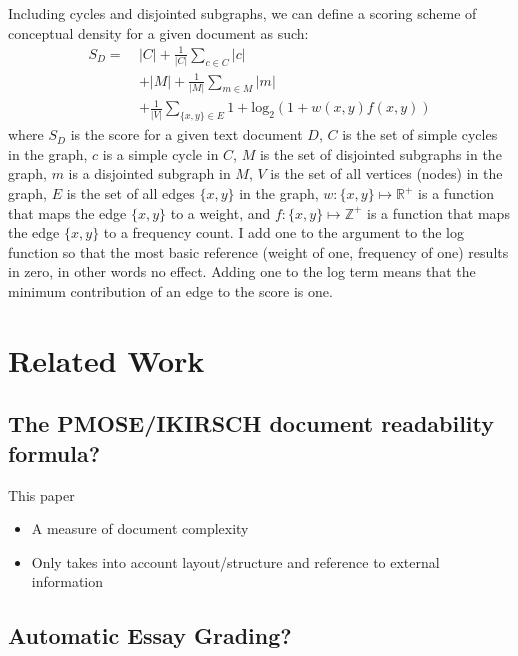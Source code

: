 \documentclass[12pt]{article}
\begin{document}
Including cycles and disjointed subgraphs, we can define a scoring scheme of conceptual density for a given document as such:
\begin{equation*}
	\begin{aligned}	
    S_D =\ &|C| + \frac{1}{|C|} \sum_{c \in C} |c| \\ 
    			&+ |M| + \frac{1}{|M|} \sum_{m \in M} |m| \\
    			&+  \frac{1}{|V|} \sum_{\{x, y\} \in E} 1 + \text{log}_2 (1 + w(x, y) f(x, y))
	\end{aligned}
\end{equation*}
where $S_D$ is the score for a given text document $D$, $C$ is the set of simple cycles in the graph, $c$ is a simple cycle in $C$, $M$ is the set of disjointed subgraphs in the graph, $m$ is a disjointed subgraph in $M$, $V$ is the set of all vertices (nodes) in the graph, $E$ is the set of all edges $\{x, y\} $ in the graph, $w: \{x, y\} \mapsto \mathbb{R}^+$ is a function that maps the edge $\{x, y\}$ to a weight, and $f: \{x, y\} \mapsto \mathbb{Z}^+$ is a function that maps the edge $\{x, y\}$ to a frequency count.
 I add one to the argument to the log function so that the most basic reference (weight of one, frequency of one) results in zero, in other words no effect. Adding one to the log term means that the minimum contribution of an edge to the score is one.

\section{Related Work} \label{sec:related_work}
\subsection{The  PMOSE/IKIRSCH  document readability  formula?}
This paper \citep{mosenthal1998new}
\begin{itemize}
    \item A measure of document complexity
    \item Only takes into account layout/structure and reference to external information
\end{itemize}

\subsection{Automatic Essay Grading?}
\end{document}
